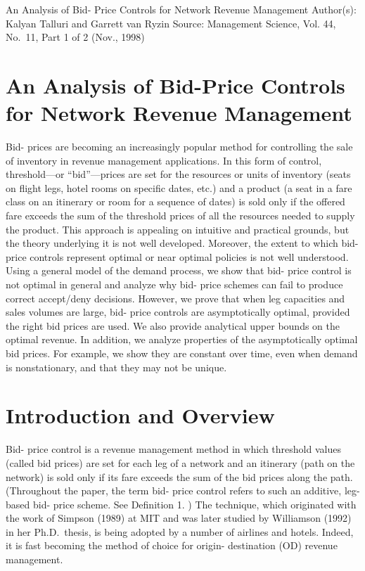 


An Analysis of Bid- Price Controls for Network Revenue Management
Author(s): Kalyan Talluri and Garrett van Ryzin
Source: Management Science, Vol. 44, No.~11, Part 1 of 2 (Nov., 1998)

\section{An Analysis of Bid-Price Controls for Network Revenue Management}\label{an-analysis-of-bid-price-controls-for-network-revenue-management}


Bid- prices are becoming an increasingly popular method for controlling
the sale of inventory in revenue management applications. In this form
of control, threshold---or ``bid''---prices are set for the resources or
units of inventory (seats on flight legs, hotel rooms on specific dates,
etc.) and a product (a seat in a fare class on an itinerary or room for
a sequence of dates) is sold only if the offered fare exceeds the sum of
the threshold prices of all the resources needed to supply the product.
This approach is appealing on intuitive and practical grounds, but the
theory underlying it is not well developed. Moreover, the extent to
which bid- price controls represent optimal or near optimal policies is
not well understood. Using a general model of the demand process, we
show that bid- price control is not optimal in general and analyze why
bid- price schemes can fail to produce correct accept/deny decisions.
However, we prove that when leg capacities and sales volumes are large,
bid- price controls are asymptotically optimal, provided the right bid
prices are used. We also provide analytical upper bounds on the optimal
revenue. In addition, we analyze properties of the asymptotically
optimal bid prices. For example, we show they are constant over time,
even when demand is nonstationary, and that they may not be unique.

\section{Introduction and Overview}\label{introduction-and-overview}

Bid- price control is a revenue management method in which threshold
values (called bid prices) are set for each leg of a network and an
itinerary (path on the network) is sold only if its fare exceeds the sum
of the bid prices along the path. (Throughout the paper, the term bid-
price control refers to such an additive, leg- based bid- price scheme.
See Definition 1. ) The technique, which originated with the work of
Simpson (1989) at MIT and was later studied by Williamson (1992) in her
Ph.D.~thesis, is being adopted by a number of airlines and hotels.
Indeed, it is fast becoming the method of choice for origin- destination
(OD) revenue management.


